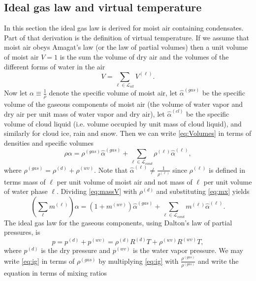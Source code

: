 \documentclass{agujournal}
\begin{document}
{%
\subsection{Ideal gas law and virtual temperature}\label{sec:tv}
In this section the ideal gas law is derived for moist air containing condensates. Part of that derivation is the definition of virtual temperature. If we assume that moist air obeys Amagat's law (or the law of partial volumes) then a unit volume of moist air $V=1$ is the sum the volume of dry air and the volumes of the different forms of water in the air
\begin{equation}
V=\sum_{\ell \in \mathcal{L}_{all}} V^{(\ell)}.\label{eq:Volumes}
\end{equation}
Now let $\alpha\equiv \frac{1}{\rho}$ denote the specific volume of moist air, let $\hat{\alpha}^{(gas)}$ be the specific volume of the gaseous components of moist air (the volume of water vapor and dry air per unit mass of water vapor and dry air), let $\hat{\alpha}^{(cl)}$ be the specific volume of cloud liquid (i.e. volume occupied by unit mass of cloud liquid), and similarly for cloud ice, rain and snow. Then we can write \eqref{eq:Volumes} in terms of densities and specific volumes
\begin{equation}
\rho \alpha=\rho^{(gas)}\hat{\alpha}^{(gas)}+\sum_{\ell\in \mathcal{L}_{cond}}\rho^{(\ell)}\hat{\alpha}^{(\ell)},\label{eq:massV}
\end{equation}
where $\rho^{(gas)}=\rho^{(d)}+\rho^{(wv)}$. Note that $\hat{\alpha}^{(\ell)}\neq \frac{1}{\rho^{(\ell)}}$ since $\rho^{(\ell)}$ is defined in terms mass of $\ell$ per unit volume of moist air and not mass of $\ell$ per unit volume of water phase $\ell$. Dividing \eqref{eq:massV} with $\rho^{(d)}$ and substituting \eqref{eq:mx} yields
\begin{equation}
  \left(\sum_\ell m^{(\ell)}\right) \alpha = \left( 1+m^{(wv)}\right) \hat{\alpha}^{(gas)}+\sum_{\ell\in \mathcal{L}_{cond}}m^{(\ell)}\hat{\alpha}^{(\ell)}.\label{eq:vol}
\end{equation}
The ideal gas law for the gaseous components, using Dalton's law of partial pressures, is
\begin{equation}
p=p^{(d)}+p^{(wv)}=\rho^{(d)} R^{(d)} T+\rho^{(wv)} R^{(wv)} T,\label{eq:ig}
\end{equation}
where $p^{(d)}$ is the dry pressure and $p^{(wv)}$ is the water vapor pressure. We may write \eqref{eq:ig} in terms of $\rho^{(gas)}$ by multiplying \eqref{eq:ig} with $\frac{\rho^{(gas)}}{\rho^{(gas)}}$ and write the equation in terms of mixing ratios
}
\end{document}
